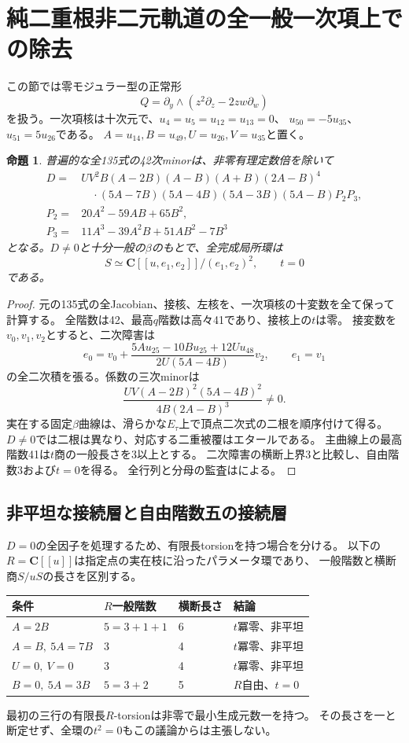 \documentclass[11pt,a4paper]{ltjsarticle}
\newcommand{\CC}{\mathbf C}
\newtheorem{proposition}[theorem]{命題}
\theoremstyle{remark}
\begin{document}
\section{純二重根非二元軌道の全一般一次項上での除去}
この節では零モジュラー型の正常形
\[
 Q=\partial_y\wedge(z^2\partial_z-2zw\partial_w)
\]
を扱う。一次項核は十次元で、$u_4=u_5=u_{12}=u_{13}=0$、
$u_{50}=-5u_{35}$、$u_{51}=5u_{26}$である。
$A=u_{14},B=u_{49},U=u_{26},V=u_{35}$と置く。
\begin{proposition}
普遍的な全135式の42次minorは、非零有理定数倍を除いて
\begin{align*}
 D={}&UV^2B(A-2B)(A-B)(A+B)(2A-B)^4\\
 &\quad\cdot(5A-7B)(5A-4B)(5A-3B)(5A-B)P_2P_3,\\
 P_2={}&20A^2-59AB+65B^2,\\
 P_3={}&11A^3-39A^2B+51AB^2-7B^3
\end{align*}
となる。$D\ne0$と十分一般の$\beta$のもとで、全完成局所環は
\[
 S\simeq\CC[[u,e_1,e_2]]/(e_1,e_2)^2,\qquad t=0
\]
である。
\end{proposition}
\begin{proof}
元の135式の全Jacobian、接核、左核を、一次項核の十変数を全て保って計算する。
全階数は42、最高$q$階数は高々41であり、接核上の$t$は零。
接変数を$v_0,v_1,v_2$とすると、二次障害は
\[
 e_0=v_0+\frac{5Au_{25}-10Bu_{25}+12Uu_{48}}{2U(5A-4B)}v_2,
 \qquad e_1=v_1
\]
の全二次積を張る。係数の三次minorは
\[
 \frac{UV(A-2B)^2(5A-4B)^2}{4B(2A-B)^3}\ne0.
\]
実在する固定$\beta$曲線は、滑らかな$E_\tau$上で頂点二次式の二根を順序付けて得る。
$D\ne0$では二根は異なり、対応する二重被覆はエタールである。
主曲線上の最高階数41は$t$商の一般長さを3以上とする。
二次障害の横断上界3と比較し、自由階数3および$t=0$を得る。
全行列と分母の監査は\cite{double-open-v38}による。
\end{proof}

\subsection{非平坦な接続層と自由階数五の接続層}
$D=0$の全因子を処理するため、有限長torsionを持つ場合を分ける。
以下の$R=\CC[[u]]$は指定点の実在枝に沿ったパラメータ環であり、
一般階数と横断商$S/uS$の長さを区別する。
\begin{center}
\begin{tabular}{llll}
\toprule
条件 & $R$一般階数 & 横断長さ & 結論\\
\midrule
$A=2B$ & $5=3+1+1$ & 6 & $t$冪零、非平坦\\
$A=B,\ 5A=7B$ & 3 & 4 & $t$冪零、非平坦\\
$U=0,\ V=0$ & 3 & 4 & $t$冪零、非平坦\\
$B=0,\ 5A=3B$ & $5=3+2$ & 5 & $R$自由、$t=0$\\
\bottomrule
\end{tabular}
\end{center}
最初の三行の有限長$R$-torsionは非零で最小生成元数一を持つ。
その長さを一と断定せず、全環の$t^2=0$もこの議論からは主張しない。
\end{document}
